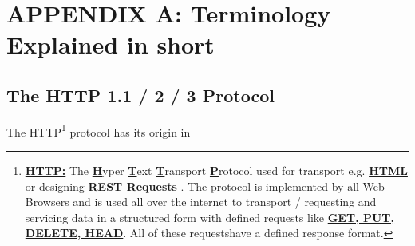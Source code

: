 \documentclass[10pt,a4paper,english]{article}
\begin{document}
\section{APPENDIX A: Terminology Explained in short}
\subsection{The HTTP 1.1 / 2 / 3 Protocol}
\begin{flushleft}
The HTTP\footnote{\textbf{\underline {HTTP:}}  The \textbf{\underline {H}}yper \textbf{\underline {T}}ext \textbf{\underline {T}}ransport \textbf{\underline {P}}rotocol used for transport  e.g. \textbf{\underline {HTML}} or designing  \textbf{\underline {REST Requests}} . The protocol is implemented by all Web Browsers and is used all over the internet to transport / requesting and servicing data in a structured form with defined requests like \textbf{\underline {GET, PUT, DELETE, HEAD}}. All of these requestshave a defined response format.} protocol has its origin in 
\end{flushleft}
\end{document}
